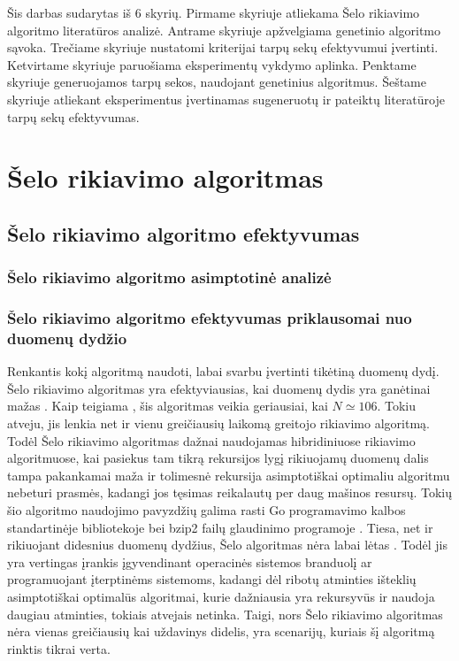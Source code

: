 \documentclass{VUMIFInfKursinis}
\begin{document}
Šis darbas sudarytas iš 6 skyrių.
Pirmame skyriuje atliekama Šelo rikiavimo algoritmo literatūros analizė.
Antrame skyriuje apžvelgiama genetinio algoritmo sąvoka.
Trečiame skyriuje nustatomi kriterijai tarpų sekų efektyvumui įvertinti.
Ketvirtame skyriuje paruošiama eksperimentų vykdymo aplinka.
Penktame skyriuje generuojamos tarpų sekos, naudojant genetinius algoritmus.
Šeštame skyriuje atliekant eksperimentus įvertinamas sugeneruotų ir pateiktų literatūroje tarpų sekų efektyvumas.

\section{Šelo rikiavimo algoritmas}

\subsection{Šelo rikiavimo algoritmo efektyvumas}

\subsubsection{Šelo rikiavimo algoritmo asimptotinė analizė}

\subsubsection{Šelo rikiavimo algoritmo efektyvumas priklausomai nuo duomenų dydžio}

Renkantis kokį algoritmą naudoti, labai svarbu įvertinti tikėtiną duomenų dydį.
Šelo rikiavimo algoritmas yra efektyviausias, kai duomenų dydis yra ganėtinai mažas \cite{ciura2001best}.
Kaip teigiama \cite{simpson1999faster}, šis algoritmas veikia geriausiai, kai $N \simeq 106$.
Tokiu atveju, jis lenkia net ir vienu greičiausių laikomą greitojo rikiavimo algoritmą.
Todėl Šelo rikiavimo algoritmas dažnai naudojamas hibridiniuose rikiavimo algoritmuose, kai pasiekus tam tikrą rekursijos lygį
rikiuojamų duomenų dalis tampa pakankamai maža ir tolimesnė rekursija asimptotiškai optimaliu algoritmu nebeturi prasmės,
kadangi jos tęsimas reikalautų per daug mašinos resursų.
Tokių šio algoritmo naudojimo pavyzdžių galima rasti Go programavimo kalbos standartinėje bibliotekoje \cite{golangsort} bei
bzip2 failų glaudinimo programoje \cite{bzip2sort}.
Tiesa, net ir rikiuojant didesnius duomenų dydžius, Šelo algoritmas nėra labai lėtas \cite{ciura2001best}.
Todėl jis yra vertingas įrankis įgyvendinant operacinės sistemos branduolį ar programuojant įterptinėms sistemoms, kadangi dėl ribotų atminties išteklių
asimptotiškai optimalūs algoritmai, kurie dažniausia yra rekursyvūs ir naudoja daugiau atminties, tokiais atvejais netinka.
Taigi, nors Šelo rikiavimo algoritmas nėra vienas greičiausių kai uždavinys didelis,
yra scenarijų, kuriais šį algoritmą rinktis tikrai verta.
\end{document}
